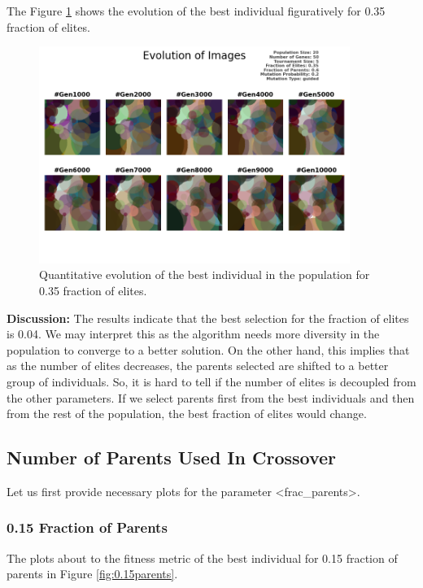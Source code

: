 \documentclass{assignment}
\begin{document}
The Figure \ref{fig:0.35elites_image} shows the evolution of the best individual figuratively for 0.35 fraction of elites.

\begin{figure}[!htb]
    \centering
    \includegraphics[width=0.9\textwidth]{figures/images_output_20_50_5_0.35_0.6_0.2_guided.png}
    \caption{Quantitative evolution of the best individual in the population for 0.35 fraction of elites.}
    \label{fig:0.35elites_image}
\end{figure}

\textbf{Discussion:} The results indicate that the best selection for the fraction of elites is 0.04. We may interpret this as the algorithm needs more diversity in the population to converge to a better solution. On the other hand, this implies that as the number of elites decreases, the parents selected are shifted to a better group of individuals. So, it is hard to tell if the number of elites is decoupled from the other parameters. If we select parents first from the best individuals and then from the rest of the population, the best fraction of elites would change.

\subsection{Number of Parents Used In Crossover}

Let us first provide necessary plots for the parameter \textless{}frac\_parents\textgreater{}.

\subsubsection{0.15 Fraction of Parents}
The plots about to the fitness metric of the best individual for 0.15 fraction of parents in Figure \ref{fig:0.15parents}.
\end{document}
